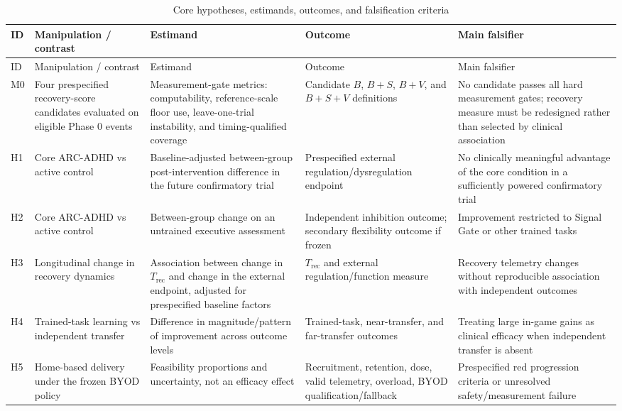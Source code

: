\begingroup
\small
\setlength{\LTpre}{6pt}
\setlength{\LTpost}{6pt}
\renewcommand{\arraystretch}{1.1}
\begin{longtable}{p{0.8cm}p{2.5cm}p{2.5cm}p{2.5cm}p{3.0cm}}
\caption{Core hypotheses, estimands, outcomes, and falsification criteria}\label{tab:core-hypotheses}\\
\toprule
ID & Manipulation / contrast & Estimand & Outcome & Main falsifier \\

\midrule
\endfirsthead
\toprule
ID & Manipulation / contrast & Estimand & Outcome & Main falsifier \\

\midrule
\endhead
\midrule
\endfoot
\bottomrule
\endlastfoot
M0 & Four prespecified recovery-score candidates evaluated on eligible Phase 0 events & Measurement-gate metrics: computability, reference-scale floor use, leave-one-trial instability, and timing-qualified coverage & Candidate \(B\), \(B+S\), \(B+V\), and \(B+S+V\) definitions & No candidate passes all hard measurement gates; recovery measure must be redesigned rather than selected by clinical association \\
H1 & Core ARC-ADHD vs active control & Baseline-adjusted between-group post-intervention difference in the future confirmatory trial & Prespecified external regulation/\allowbreak dysregulation endpoint & No clinically meaningful advantage of the core condition in a sufficiently powered confirmatory trial \\
H2 & Core ARC-ADHD vs active control & Between-group change on an untrained executive assessment & Independent inhibition outcome; secondary flexibility outcome if frozen & Improvement restricted to Signal Gate or other trained tasks \\
H3 & Longitudinal change in recovery dynamics & Association between change in \(T_{\mathrm{rec}}\) and change in the external endpoint, adjusted for prespecified baseline factors & \(T_{\mathrm{rec}}\) and external regulation/\allowbreak function measure & Recovery telemetry changes without reproducible association with independent outcomes \\
H4 & Trained-task learning vs independent transfer & Difference in magnitude/pattern of improvement across outcome levels & Trained-task, near-transfer, and far-transfer outcomes & Treating large in-game gains as clinical efficacy when independent transfer is absent \\
H5 & Home-based delivery under the frozen BYOD policy & Feasibility proportions and uncertainty, not an efficacy effect & Recruitment, retention, dose, valid telemetry, overload, BYOD qualification/\allowbreak fallback & Prespecified red progression criteria or unresolved safety/\allowbreak measurement failure \\

\end{longtable}
